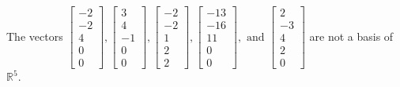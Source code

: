 \begin{exercise}
\begin{exerciseStatement}
  \end{exerciseStatement}
  \begin{exerciseAnswer}
   The vectors \(\left[\begin{array}{r}
-2 \\
-2 \\
4 \\
0 \\
0
\end{array}\right] , \left[\begin{array}{r}
3 \\
4 \\
-1 \\
0 \\
0
\end{array}\right] , \left[\begin{array}{r}
-2 \\
-2 \\
1 \\
2 \\
2
\end{array}\right] , \left[\begin{array}{r}
-13 \\
-16 \\
11 \\
0 \\
0
\end{array}\right] , \text{ and } \left[\begin{array}{r}
2 \\
-3 \\
4 \\
2 \\
0
\end{array}\right]\) 
  	 are not  a basis of \(\mathbb{R}^5\).
  


  \end{exerciseAnswer}
\end{exercise}